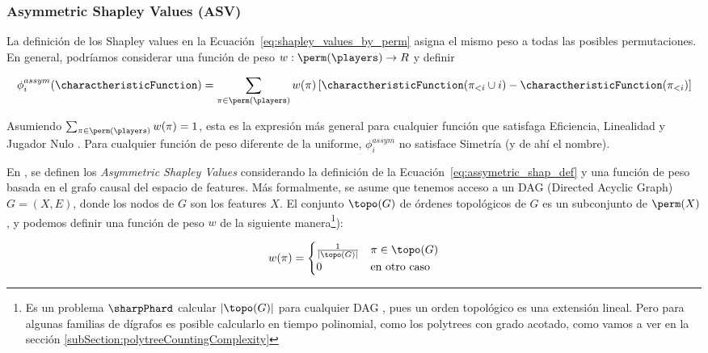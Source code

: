 
\subsubsection{Asymmetric Shapley Values (ASV)}

La definición de los Shapley values en la Ecuación~\ref{eq:shapley_values_by_perm} asigna el mismo peso a todas las posibles permutaciones. En general, podríamos considerar una función de peso \(w:\perm(\players) \to R\) y definir

\begin{align}\label{eq:assymetric_shap_def}
	\phi_{i}^{assym}(\charactheristicFunction) = \sum_{\pi \in \perm(\players)} w(\pi) \left[ \charactheristicFunction(\pi_{<i} \cup {i}) - \charactheristicFunction(\pi_{<i}) \right] 
\end{align}

Asumiendo \(\sum_{\pi \in \perm(\players)} w(\pi) = 1\), esta es la expresión más general para cualquier función que satisfaga Eficiencia, Linealidad y Jugador Nulo \cite{frye2019asymmetric}. Para cualquier función de peso diferente de la uniforme, \(\phi_i^{assym}\) no satisface Simetría (y de ahí el nombre).

En \cite{frye2019asymmetric}, se definen los \textit{Asymmetric Shapley Values} considerando la definición de la Ecuación~\ref{eq:assymetric_shap_def} y una función de peso basada en el grafo causal del espacio de features. Más formalmente, se asume que tenemos acceso a un DAG (Directed Acyclic Graph) \(G = (X, E)\), donde los nodos de \(G\) son los features \(X\). El conjunto \(\topo(G)\) de órdenes topológicos de \(G\) es un subconjunto de \(\perm(X)\), y podemos definir una función de peso \(w\) de la siguiente manera\footnote{Es un problema $\sharpPhard$ calcular $|\topo(G)|$  para cualquier DAG \cite{countingLinearExtensions}, pues un orden topológico es una extensión lineal. Pero para algunas familias de dígrafos es posible calcularlo en tiempo polinomial, como los polytrees con grado acotado, como vamos a ver en la sección \ref{subSection:polytreeCountingComplexity} }):

\[
w(\pi) = \begin{cases}
	\frac{1}{|\topo(G)|}  & \pi \in \topo(G) \\
	0 & \text{en otro caso}
\end{cases}    
\]


